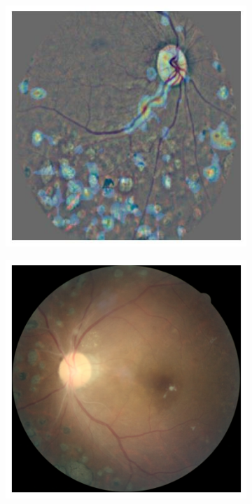 \begin{figure}[tb]
\begin{subfigure}[b]{0.32\textwidth}
     \end{subfigure}
    \hfill
    \begin{subfigure}[b]{0.32\textwidth}
         \centering
         \includegraphics[width=\textwidth, height=\textwidth]{figures/chapter7/attention/43670_left_attention.jpeg}
    \end{subfigure}
    \bigskip
     \begin{subfigure}[b]{0.32\textwidth}
         \centering
         \includegraphics[width=\textwidth, height=\textwidth]{figures/chapter7/attention/28699_left_hr.png}

\end{subfigure}
\end{figure}

